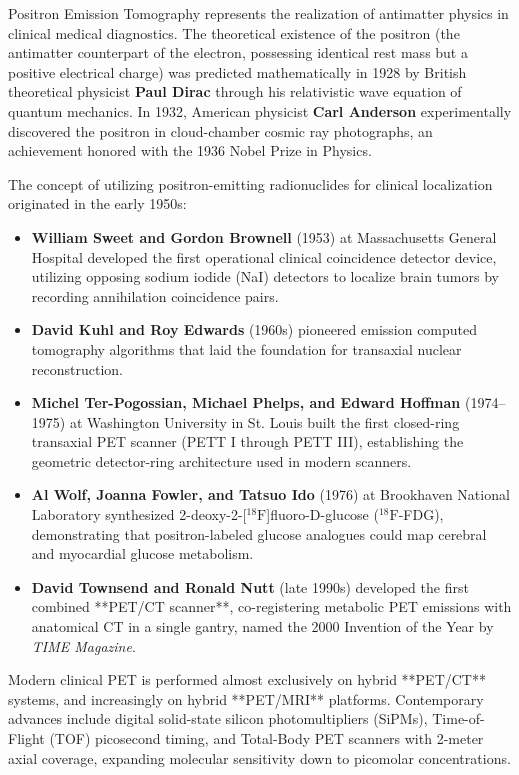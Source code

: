 \documentclass[11pt,a4paper]{article}
\begin{document}
Positron Emission Tomography represents the realization of antimatter physics in clinical medical diagnostics. The theoretical existence of the positron (the antimatter counterpart of the electron, possessing identical rest mass but a positive electrical charge) was predicted mathematically in 1928 by British theoretical physicist \textbf{Paul Dirac} through his relativistic wave equation of quantum mechanics. In 1932, American physicist \textbf{Carl Anderson} experimentally discovered the positron in cloud-chamber cosmic ray photographs, an achievement honored with the 1936 Nobel Prize in Physics.

The concept of utilizing positron-emitting radionuclides for clinical localization originated in the early 1950s:
\begin{itemize}[leftmargin=*]
    \item \textbf{William Sweet and Gordon Brownell} (1953) at Massachusetts General Hospital developed the first operational clinical coincidence detector device, utilizing opposing sodium iodide (NaI) detectors to localize brain tumors by recording annihilation coincidence pairs.
    \item \textbf{David Kuhl and Roy Edwards} (1960s) pioneered emission computed tomography algorithms that laid the foundation for transaxial nuclear reconstruction.
    \item \textbf{Michel Ter-Pogossian, Michael Phelps, and Edward Hoffman} (1974--1975) at Washington University in St. Louis built the first closed-ring transaxial PET scanner (PETT I through PETT III), establishing the geometric detector-ring architecture used in modern scanners.
    \item \textbf{Al Wolf, Joanna Fowler, and Tatsuo Ido} (1976) at Brookhaven National Laboratory synthesized 2-deoxy-2-[$^{18}\text{F}$]fluoro-D-glucose ($^{18}\text{F}$-FDG), demonstrating that positron-labeled glucose analogues could map cerebral and myocardial glucose metabolism.
    \item \textbf{David Townsend and Ronald Nutt} (late 1990s) developed the first combined **PET/CT scanner**, co-registering metabolic PET emissions with anatomical CT in a single gantry, named the 2000 Invention of the Year by \textit{TIME Magazine}.
\end{itemize}

Modern clinical PET is performed almost exclusively on hybrid **PET/CT** systems, and increasingly on hybrid **PET/MRI** platforms. Contemporary advances include digital solid-state silicon photomultipliers (SiPMs), Time-of-Flight (TOF) picosecond timing, and Total-Body PET scanners with 2-meter axial coverage, expanding molecular sensitivity down to picomolar concentrations.
\end{document}
